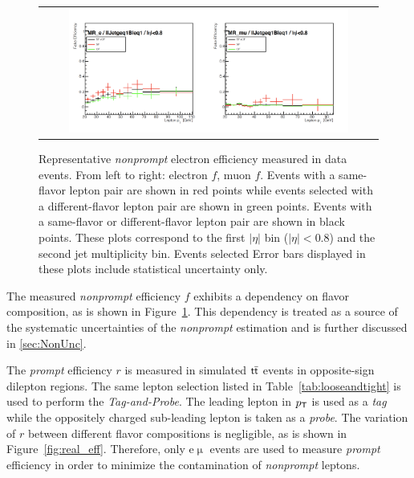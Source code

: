 \begin{figure}[tbh!]
 \begin{center}
 \begin{tabular}{c}
 \includegraphics[width=0.85\textwidth]{figures/Part3/Nonprompt/MR/fake_eff}
 \end{tabular}
 \caption{Representative \emph{nonprompt} electron efficiency measured in data events. From left to right: electron $f$, muon $f$. Events with a same-flavor lepton pair are shown in red points while events selected with a different-flavor lepton pair are shown in green points. Events with a same-flavor or different-flavor lepton pair are shown in black points. These plots correspond to the first $|\eta|$ bin ($|\eta|<$0.8) and the second jet multiplicity bin. Events selected Error bars displayed in these plots include statistical uncertainty only. }
 \label{fig:fake_eff}
 \end{center}
\end{figure}

The measured \emph{nonprompt} efficiency $f$ exhibits a dependency on flavor composition, as is shown in Figure~\ref{fig:fake_eff}. This dependency is treated as a source of the systematic uncertainties of the \emph{nonprompt} estimation and is further discussed in \autoref{sec:NonUnc}.

The \emph{prompt} efficiency $r$ is measured in simulated $\textsf{t}\overline{\textsf{t}}$ events in opposite-sign dilepton regions. The same lepton selection listed in Table~\ref{tab:looseandtight} is used to perform the \emph{Tag-and-Probe}. The leading lepton in $p_{\textsf{T}}$ is used as a \emph{tag} while the oppositely charged sub-leading lepton is taken as a \emph{probe}. The variation of $r$ between different flavor compositions is negligible, as is shown in Figure~\ref{fig:real_eff}. Therefore, only e$\upmu$ events are used to measure \emph{prompt} efficiency in order to minimize the contamination of \emph{nonprompt} leptons.

